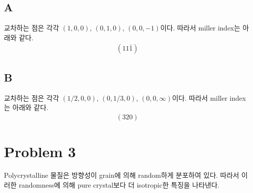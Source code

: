 \documentclass[a4paper]{oblivoir}
\begin{document}
\subsection{A}
교차하는 점은 각각 $(1,0,0)$, $(0,1,0)$, $(0,0,-1)$이다. 따라서 miller index는 아래와 같다.
\begin{align}
	(11\bar{1})
\end{align}

\subsection{B}
교차하는 점은 각각 $(1/2,0,0)$, $(0,1/3,0)$, $(0,0,\infty)$이다. 따라서 miller index는 아래와 같다.
\begin{align}
	(320)
\end{align}

\section{Problem 3}
Polycrystalline 물질은 방향성이 grain에 의해 random하게 분포하여 있다. 따라서 이러한 randomness에 의해 pure crystal보다 더 isotropic한 특징을 나타낸다.
\end{document}
